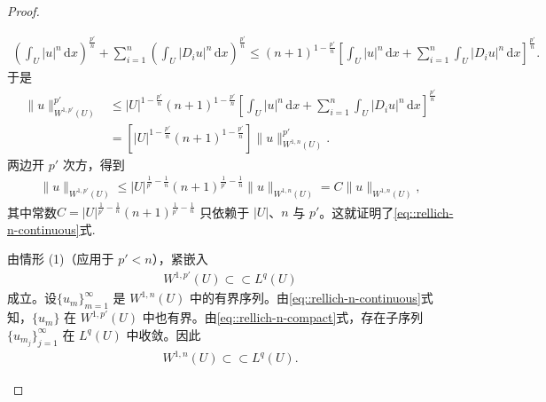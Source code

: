 \documentclass[../../main.tex]{subfiles}
\begin{document}
\begin{proof}
\begin{enumerate}[(1)]
\begin{align*}
\left(\int_U |u|^{n}\,\mathrm{d}x\right)^{\frac{p'}{n}}
+\sum_{i=1}^{n}\left(\int_U |D_i u|^{n}\,\mathrm{d}x\right)^{\frac{p'}{n}}\leqslant (n+1)^{1-\frac{p'}{n}}
\left[\int_U |u|^{n}\,\mathrm{d}x+\sum_{i=1}^{n}\int_U |D_i u|^{n}\,\mathrm{d}x\right]^{\frac{p'}{n}}.
\end{align*}
于是
\begin{align*}
\|u\|_{W^{1,p'}(U)}^{p'}
&\leqslant |U|^{1-\frac{p'}{n}}(n+1)^{1-\frac{p'}{n}}
\left[\int_U |u|^{n}\,\mathrm{d}x+\sum_{i=1}^{n}\int_U |D_i u|^{n}\,\mathrm{d}x\right]^{\frac{p'}{n}}\\
&=\left[|U|^{1-\frac{p'}{n}}(n+1)^{1-\frac{p'}{n}}\right]
\|u\|_{W^{1,n}(U)}^{p'}.
\end{align*}
两边开 $p'$ 次方，得到
\begin{align*}
\|u\|_{W^{1,p'}(U)}
\leqslant |U|^{\frac{1}{p'}-\frac{1}{n}}(n+1)^{\frac{1}{p'}-\frac{1}{n}}\|u\|_{W^{1,n}(U)}=C\|u\|_{W^{1,n}(U)},
\end{align*}
其中常数$C=|U|^{\frac{1}{p'}-\frac{1}{n}}(n+1)^{\frac{1}{p'}-\frac{1}{n}}$
只依赖于 $|U|$、$n$ 与 $p'$。这就证明了\eqref{eq::rellich-n-continuous}式.

由情形 (1)（应用于 $p'<n$），紧嵌入
\begin{align}\label{eq::rellich-n-compact}
W^{1,p'}(U)\subset\subset L^{q}(U)
\end{align}
成立。设$\{u_{m}\}_{m=1}^{\infty}$ 是 $W^{1,n}(U)$ 中的有界序列。由\eqref{eq::rellich-n-continuous}式知，$\{u_{m}\}$ 在 $W^{1,p'}(U)$ 中也有界。由\eqref{eq::rellich-n-compact}式，存在子序列 $\{u_{m_{j}}\}_{j=1}^{\infty}$ 在 $L^{q}(U)$ 中收敛。因此
\begin{align*}
W^{1,n}(U)\subset\subset L^{q}(U).
\end{align*}


\end{enumerate}
\end{proof}
\end{document}

